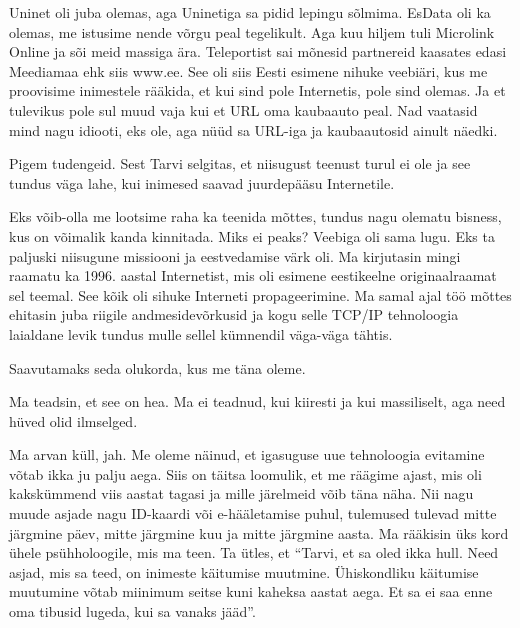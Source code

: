 
Uninet oli juba olemas, aga Uninetiga sa pidid lepingu sõlmima. 
EsData oli ka olemas, me istusime nende võrgu peal tegelikult. 
Aga kuu hiljem tuli Microlink Online ja sõi meid massiga 
ära.  Teleportist sai mõnesid partnereid kaasates edasi 
Meediamaa ehk siis www.ee. See oli siis Eesti 
esimene nihuke veebiäri, kus me proovisime inimestele rääkida, et kui sind pole 
Internetis, pole sind olemas. Ja et tulevikus pole sul muud vaja kui et URL oma 
kaubaauto peal. Nad vaatasid mind nagu idiooti, eks ole, aga nüüd sa URL-iga ja 
kaubaautosid ainult näedki. 


Pigem  tudengeid. Sest Tarvi selgitas, et niisugust teenust turul ei ole ja see 
tundus väga lahe, kui inimesed saavad juurdepääsu Internetile. 


Eks võib-olla me lootsime raha ka teenida mõttes, tundus nagu olematu bisness, 
kus on võimalik kanda kinnitada. Miks ei peaks? Veebiga oli sama lugu. Eks ta 
paljuski niisugune missiooni ja eestvedamise värk oli. Ma kirjutasin mingi 
raamatu ka 1996. aastal  Internetist, mis oli esimene eestikeelne 
originaalraamat sel teemal. See kõik oli sihuke Interneti propageerimine. Ma samal ajal  
töö mõttes ehitasin juba riigile andmesidevõrkusid ja kogu selle TCP/IP 
tehnoloogia  laialdane levik tundus mulle sellel kümnendil väga-väga tähtis.


Saavutamaks seda olukorda, kus me täna oleme. 


Ma teadsin, et see on hea. Ma ei teadnud, kui kiiresti ja kui massiliselt, aga  
need hüved olid ilmselged. 


Ma arvan küll, jah. Me oleme näinud, et igasuguse uue tehnoloogia evitamine 
võtab ikka ju palju aega. Siis on täitsa loomulik, et me räägime ajast, mis oli 
 kakskümmend viis aastat tagasi ja mille järelmeid võib täna näha. Nii nagu 
muude asjade nagu ID-kaardi  või e-hääletamise puhul,  tulemused tulevad  mitte 
järgmine päev, mitte järgmine kuu ja mitte järgmine aasta. Ma rääkisin üks kord 
ühele psühholoogile, mis ma teen. Ta ütles, et \enquote{Tarvi, et sa oled ikka 
hull. Need asjad, mis sa teed, on inimeste käitumise muutmine. Ühiskondliku 
käitumise muutumine võtab miinimum seitse kuni kaheksa aastat aega. Et sa ei 
saa enne oma tibusid lugeda, kui sa vanaks jääd}.

